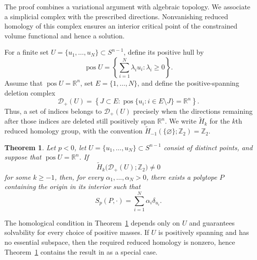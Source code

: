 \documentclass[12pt,reqno]{amsart}
\numberwithin{equation}{section}
\newtheorem{theorem}{Theorem}[section]
\theoremstyle{remark}
\DeclareMathOperator{\pos}{pos}
\newcommand{\R}{\mathbb R}
\newcommand{\Dcal}{\mathcal D}
\begin{document}
The proof combines a variational argument with algebraic topology.
We associate a simplicial complex with the prescribed directions.
Nonvanishing reduced homology of this complex ensures an interior
critical point of the constrained volume functional and hence
a solution.

For a finite set $U=\{u_1,\ldots,u_N\}\subset S^{n-1}$, define its positive hull by
\begin{equation}\label{eq:intro-positive-hull}
	\pos U
	=\left\{\sum_{i=1}^N\lambda_i u_i:\lambda_i\geq0\right\}.
\end{equation}
Assume that $\pos U=\R^n$, set $E=\{1,\ldots,N\}$, and define the positive-spanning deletion complex
\begin{equation}\label{eq:intro-deletion-complex}
	\Dcal_+(U)
	=\left\{J\subset E:
	\pos\{u_i:i\in E\setminus J\}=\R^n\right\}.
\end{equation}
Thus, a set of indices belongs to $\Dcal_+(U)$ precisely when the directions remaining after those indices are deleted still positively span $\R^n$. We write $\widetilde H_k$ for
the $k$th reduced homology group, with the convention
$\widetilde H_{-1}(\{\varnothing\};\mathbb Z_2)=\mathbb Z_2$.

\begin{theorem}\label{thm:intro-homological}
	Let $p<0$, let $U=\{u_1,\ldots,u_N\}\subset S^{n-1}$ consist of distinct points, and suppose that $\pos U=\R^n$. If
	\begin{equation}\label{eq:intro-homology-condition}
		\widetilde H_k\bigl(\Dcal_+(U);\mathbb Z_2\bigr)\neq0
	\end{equation}
	for some $k\geq-1$, then, for every $\alpha_1,\ldots,\alpha_N>0$, there exists a polytope $P$ containing the origin in its
	interior such that
	\[
	S_p(P,\cdot)=\sum_{i=1}^N\alpha_i\delta_{u_i}.
	\]

\end{theorem}

The homological condition in Theorem~\ref{thm:intro-homological} depends only on $U$ and guarantees solvability for every choice
of positive masses. If $U$ is positively spanning and has no essential subspace, then the required reduced homology is nonzero, hence Theorem~\ref{thm:intro-homological} contains the result in
\cite{ZhuNegative} as a special case.
\end{document}
